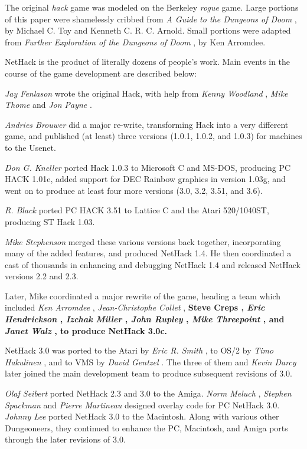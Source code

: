 The original %
{\it hack}
game was modeled on the Berkeley 
%
{\it rogue}
game.  Large portions of this paper were shamelessly
cribbed from %
{\it  A Guide to the Dungeons of Doom}%
, by Michael C. Toy
and Kenneth C. R. C. Arnold.  Small portions were adapted from
%
{\it  Further Exploration of the Dungeons of Doom}%
, by Ken Arromdee.

NetHack is the product of literally dozens of people's work.
Main events in the course of the game development are described below:


%
{\it Jay Fenlason}%
wrote the original Hack, with help from
%
{\it Kenny Woodland}%
, %
{\it Mike Thome}%
and %
{\it Jon Payne}%
.

%
{\it Andries Brouwer}%
did a major re-write, transforming Hack into a
very different game, and published (at least) three versions (1.0.1,
1.0.2, and 1.0.3) for
machines to the Usenet.

%
{\it Don G. Kneller}%
ported Hack 1.0.3 to Microsoft C and MS-DOS, producing PC
HACK 1.01e, added support for DEC Rainbow graphics in version 1.03g, and went
on to produce at least four more versions (3.0, 3.2, 3.51, and 3.6).

%
{\it R. Black}%
ported PC HACK 3.51 to Lattice C and the Atari 520/1040ST,
producing ST Hack 1.03.

%
{\it Mike Stephenson}%
merged these various versions back together,
incorporating many of the added features, and produced NetHack 1.4.
He then coordinated a cast of thousands in enhancing and debugging
NetHack 1.4 and released NetHack versions 2.2 and 2.3.

Later, Mike coordinated a major rewrite of the game, heading a
team which included %
{\it Ken Arromdee}%
, %
{\it Jean-Christophe Collet}%
, %
\bf Steve
Creps\rm%
, %
{\it Eric Hendrickson}%
, %
{\it Izchak Miller}%
, %
{\it John Rupley}%
,
%
{\it Mike Threepoint}%
, and %
{\it Janet Walz}%
, to produce NetHack 3.0c.

NetHack 3.0 was ported to the Atari by %
{\it Eric R. Smith}%
, to OS/2 by
%
{\it Timo Hakulinen}%
, and to VMS by %
{\it David Gentzel}%
.  The three of them
and %
{\it Kevin Darcy}%
later joined the main development team to produce
subsequent revisions of 3.0.

%
{\it Olaf Seibert}%
ported NetHack 2.3 and 3.0 to the Amiga.
%
{\it Norm Meluch}%
, %
{\it Stephen Spackman}%
and %
{\it Pierre Martineau}%
designed
overlay code for PC NetHack 3.0.  %
{\it Johnny Lee}%
ported
NetHack 3.0 to the Macintosh.  Along with various other Dungeoneers, they
continued to enhance the PC, Macintosh, and Amiga ports through the later
revisions of 3.0.

